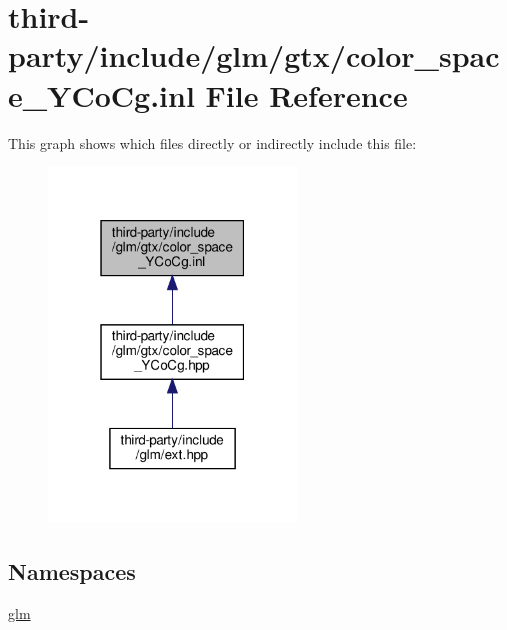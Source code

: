 \hypertarget{color__space___y_co_cg_8inl}{}\section{third-\/party/include/glm/gtx/color\+\_\+space\+\_\+\+Y\+Co\+Cg.inl File Reference}
\label{color__space___y_co_cg_8inl}
This graph shows which files directly or indirectly include this file\+:
\nopagebreak
\begin{figure}[H]
\begin{center}
\leavevmode
\includegraphics[width=187pt]{color__space___y_co_cg_8inl__dep__incl}
\end{center}
\end{figure}
\subsection*{Namespaces}
\begin{DoxyCompactItemize}
\item 
 \hyperlink{namespaceglm}{glm}
\end{DoxyCompactItemize}
